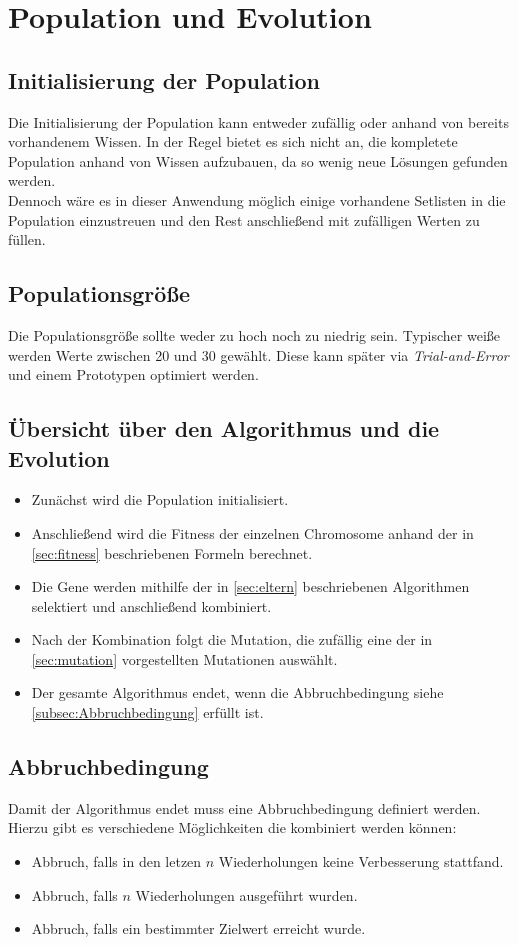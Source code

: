 \section{Population und Evolution}\label{sec:popEv}
\subsection{Initialisierung der Population}
Die Initialisierung der Population kann entweder zufällig oder anhand von bereits vorhandenem Wissen.
In der Regel bietet es sich nicht an, die kompletete Population anhand von Wissen aufzubauen, da so
wenig neue Lösungen gefunden werden.\\
Dennoch wäre es in dieser Anwendung möglich einige vorhandene Setlisten in die Population einzustreuen und den Rest
anschließend mit zufälligen Werten zu füllen.

\subsection{Populationsgröße}
Die Populationsgröße sollte weder zu hoch noch zu niedrig sein. Typischer weiße werden Werte zwischen
20 und 30 gewählt. Diese kann später via \textit{Trial-and-Error} und einem Prototypen optimiert werden.

\subsection{Übersicht über den Algorithmus und die Evolution}

\begin{itemize}
    \item Zunächst wird die Population initialisiert.
    \item Anschließend wird die Fitness der einzelnen Chromosome anhand der in \autoref{sec:fitness} beschriebenen
        Formeln berechnet.
    \item Die Gene werden mithilfe der in \autoref{sec:eltern} beschriebenen Algorithmen selektiert und anschließend
        kombiniert.
    \item Nach der Kombination folgt die Mutation, die zufällig eine der in \autoref{sec:mutation} vorgestellten
    Mutationen auswählt.
    \item Der gesamte Algorithmus endet, wenn die Abbruchbedingung siehe \autoref{subsec:Abbruchbedingung} erfüllt ist.
\end{itemize}

\subsection{Abbruchbedingung}\label{subsec:Abbruchbedingung}
Damit der Algorithmus endet muss eine Abbruchbedingung definiert werden.
Hierzu gibt es verschiedene Möglichkeiten die kombiniert werden können:
\begin{itemize}
    \item Abbruch, falls in den letzen $n$ Wiederholungen keine Verbesserung stattfand.
    \item Abbruch, falls $n$ Wiederholungen ausgeführt wurden.
    \item Abbruch, falls ein bestimmter Zielwert erreicht wurde.
\end{itemize}

